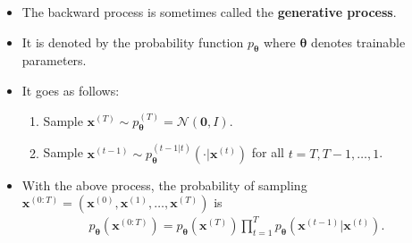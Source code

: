 \documentclass[10pt]{article}
\newcommand{\ve}[1]{\mathbf{#1}}
\newcommand{\ves}[1]{\boldsymbol{#1}}
\newcommand{\mcal}[1]{\mathcal{#1}}
\begin{document}
\begin{itemize}
  \item The backward process is sometimes called the {\bf generative process}.
  
  \item It is denoted by the probability function $p_{\ves{\theta}}$ where $\ves{\theta}$ denotes trainable parameters. 
  
  \item It goes as follows:
  \begin{enumerate}
    \item Sample $\ve{x}^{(T)} \sim p_{\ves{\theta}}^{(T)} = \mcal{N}(\ve{0},I)$.
    \item Sample $\ve{x}^{(t-1)} \sim p_{\ves{\theta}}^{(t-1|t)}(\cdot|\ve{x}^{(t)})$ for all $t = T, T-1, \dotsc, 1$.
  \end{enumerate}
  
  \item With the above process, the probability of sampling $\ve{x}^{(0:T)} = (\ve{x}^{(0)}, \ve{x}^{(1)}, \dotsc, \ve{x}^{(T)})$ is
  \begin{align*}
    p_{\ves{\theta}}(\ve{x}^{(0:T)}) = p_{\ves{\theta}}(\ve{x}^{(T)}) \prod_{t=1}^T p_{\ves{\theta}}(\ve{x}^{(t-1)}|\ve{x}^{(t)}).
  \end{align*}


\end{itemize}
\end{document}
